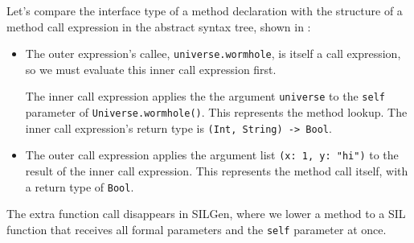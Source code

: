 \documentclass[../generics]{subfiles}
\begin{document}
\begin{figure}[b!]\label{method call expr}
\begin{center}
\end{center}
\end{figure}

Let's compare the interface type of a method declaration with the structure of a method call expression in the abstract syntax tree, shown in :
\begin{itemize}
\item The outer expression's callee, \texttt{universe.wormhole}, is itself a call expression, so we must evaluate this inner call expression first.

The inner call expression applies the the argument \texttt{universe} to the \texttt{self} parameter of \texttt{Universe.wormhole()}. This represents the method lookup. The inner call expression's return type is \verb|(Int, String) -> Bool|.
\item The outer call expression applies the argument list \verb|(x: 1, y: "hi")| to the result of the inner call expression. This represents the method call itself, with a return type of \texttt{Bool}.
\end{itemize}
The extra function call disappears in SILGen, where we lower a method to a SIL function that receives all formal parameters and the \texttt{self} parameter at once.
\end{document}
